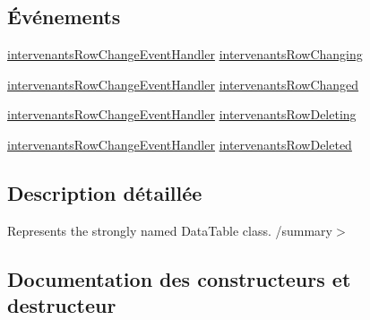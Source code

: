 \subsection*{Événements}
\begin{DoxyCompactItemize}
\item 
\hyperlink{classforma_1_1formadb_data_set_a647c81ef89a0024945d837ecab3d1d6f}{intervenants\+Row\+Change\+Event\+Handler} \hyperlink{classforma_1_1formadb_data_set_1_1intervenants_data_table_ac4e643a202bd38b5f2ea59769a3f772d}{intervenants\+Row\+Changing}
\item 
\hyperlink{classforma_1_1formadb_data_set_a647c81ef89a0024945d837ecab3d1d6f}{intervenants\+Row\+Change\+Event\+Handler} \hyperlink{classforma_1_1formadb_data_set_1_1intervenants_data_table_a7bb89e08d8c6fd82d27dcd4507028670}{intervenants\+Row\+Changed}
\item 
\hyperlink{classforma_1_1formadb_data_set_a647c81ef89a0024945d837ecab3d1d6f}{intervenants\+Row\+Change\+Event\+Handler} \hyperlink{classforma_1_1formadb_data_set_1_1intervenants_data_table_a493dc1e07d9ed90afcc3dfad45ddf743}{intervenants\+Row\+Deleting}
\item 
\hyperlink{classforma_1_1formadb_data_set_a647c81ef89a0024945d837ecab3d1d6f}{intervenants\+Row\+Change\+Event\+Handler} \hyperlink{classforma_1_1formadb_data_set_1_1intervenants_data_table_a1be93fd32f8d4a6ff12d7a815f889b59}{intervenants\+Row\+Deleted}
\end{DoxyCompactItemize}


\subsection{Description détaillée}
Represents the strongly named Data\+Table class. /summary$>$ 

\subsection{Documentation des constructeurs et destructeur}
